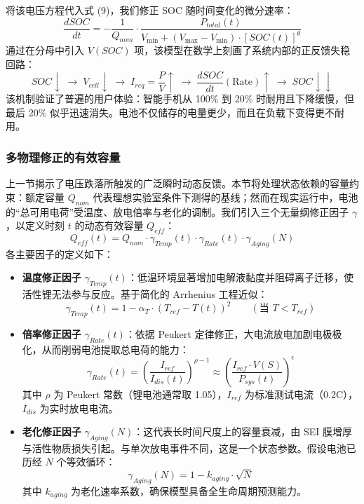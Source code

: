 \documentclass[11pt,a4paper]{ctexart}
\begin{document}
将该电压方程代入式 (9)，我们修正 SOC 随时间变化的微分速率：
\begin{equation}
\frac{dSOC}{dt} = -\frac{1}{Q_{nom}}\cdot\frac{P_{total}(t)}{V_{\min} + \left(V_{\max} - V_{\min}\right)\cdot [SOC(t)]^{\theta}}
\end{equation}
通过在分母中引入 $V(SOC)$ 项，该模型在数学上刻画了系统内部的正反馈失稳回路：
\[
SOC\downarrow \;\longrightarrow\; V_{cell}\downarrow \;\longrightarrow\; I_{req}=\frac{P}{V}\uparrow \;\longrightarrow\; \frac{dSOC}{dt}(\text{Rate})\uparrow \;\longrightarrow\; SOC\downarrow\downarrow
\]
该机制验证了普遍的用户体验：智能手机从 100\% 到 20\% 时耐用且下降缓慢，但最后 20\% 似乎迅速消失。电池不仅储存的电量更少，而且在负载下变得更不耐用。

\subsubsection{多物理修正的有效容量}

上一节揭示了电压跌落所触发的广泛瞬时动态反馈。本节将处理状态依赖的容量约束：额定容量 $Q_{nom}$ 代表理想实验室条件下测得的基线；然而在现实运行中，电池的“总可用电荷”受温度、放电倍率与老化的调制。我们引入三个无量纲修正因子 $\gamma$，以定义时刻 $t$ 的动态有效容量 $Q_{eff}$：
\begin{equation}
Q_{eff}(t) = Q_{nom}\cdot\gamma_{Temp}(t)\cdot\gamma_{Rate}(t)\cdot\gamma_{Aging}(N)
\end{equation}
各主要因子的定义如下：

\begin{itemize}[leftmargin=2em]
\item \textbf{温度修正因子} $\gamma_{Temp}(t)$：低温环境显著增加电解液黏度并阻碍离子迁移，使活性锂无法参与反应。基于简化的 Arrhenius 工程近似\cite{panasonic2020}：
\begin{equation}
\gamma_{Temp}(t) = 1 - \alpha_T\cdot\left(T_{ref} - T(t)\right)^2 \qquad (\text{当 } T<T_{ref})
\end{equation}

\item \textbf{倍率修正因子} $\gamma_{Rate}(t)$：依据 Peukert 定律\cite{doerffel2006}修正，大电流放电加剧电极极化，从而削弱电池提取总电荷的能力：
\begin{equation}
\gamma_{Rate}(t) = \left(\frac{I_{ref}}{I_{dis}(t)}\right)^{\rho-1} \approx \left(\frac{I_{ref}\cdot V(S)}{P_{sys}(t)}\right)^{\epsilon}
\end{equation}
其中 $\rho$ 为 Peukert 常数（锂电池通常取 1.05），$I_{ref}$ 为标准测试电流（0.2C），$I_{dis}$ 为实时放电电流。

\item \textbf{老化修正因子} $\gamma_{Aging}(N)$：这代表长时间尺度上的容量衰减，由 SEI 膜增厚与活性物质损失引起。与单次放电事件不同，这是一个状态参数。假设电池已历经 $N$ 个等效循环\cite{wang2011}：
\begin{equation}
\gamma_{Aging}(N) = 1 - k_{aging}\cdot\sqrt{N}
\end{equation}
其中 $k_{aging}$ 为老化速率系数，确保模型具备全生命周期预测能力。
\end{itemize}
\end{document}
